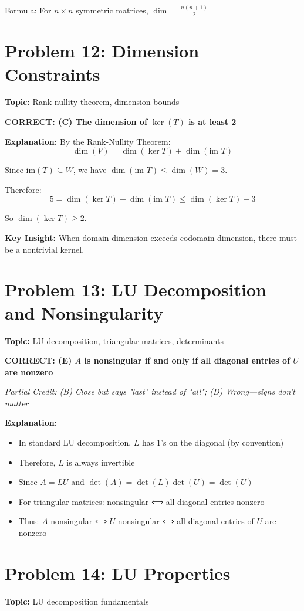 \documentclass[12pt]{amsart}
\newcommand{\correct}[1]{{\color{blue}\textbf{CORRECT: #1}}}
\newcommand{\partcred}[1]{{\color{red}\textit{Partial Credit: #1}}}
\newcommand{\hint}{\textbf{Key Insight: }}
\begin{document}
Formula: For $n \times n$ symmetric matrices, $\dim = \frac{n(n+1)}{2}$

\hrulefill

\section*{Problem 12: Dimension Constraints}
\textbf{Topic:} Rank-nullity theorem, dimension bounds

\correct{(C) The dimension of $\ker(T)$ is at least 2}

\textbf{Explanation:} By the Rank-Nullity Theorem:
$$\dim(V) = \dim(\ker T) + \dim(\text{im } T)$$

Since $\text{im}(T) \subseteq W$, we have $\dim(\text{im } T) \leq \dim(W) = 3$.

Therefore:
$$5 = \dim(\ker T) + \dim(\text{im } T) \leq \dim(\ker T) + 3$$

So $\dim(\ker T) \geq 2$.

\hint When domain dimension exceeds codomain dimension, there must be a nontrivial kernel.

\hrulefill

\section*{Problem 13: LU Decomposition and Nonsingularity}
\textbf{Topic:} LU decomposition, triangular matrices, determinants

\correct{(E) $A$ is nonsingular if and only if all diagonal entries of $U$ are nonzero}

\partcred{(B) Close but says "last" instead of "all"; (D) Wrong—signs don't matter}

\textbf{Explanation:} 
\begin{itemize}
\item In standard LU decomposition, $L$ has 1's on the diagonal (by convention)
\item Therefore, $L$ is always invertible
\item Since $A = LU$ and $\det(A) = \det(L)\det(U) = \det(U)$
\item For triangular matrices: nonsingular ⟺ all diagonal entries nonzero
\item Thus: $A$ nonsingular ⟺ $U$ nonsingular ⟺ all diagonal entries of $U$ are nonzero
\end{itemize}

\hrulefill

\section*{Problem 14: LU Properties}
\textbf{Topic:} LU decomposition fundamentals
\end{document}
